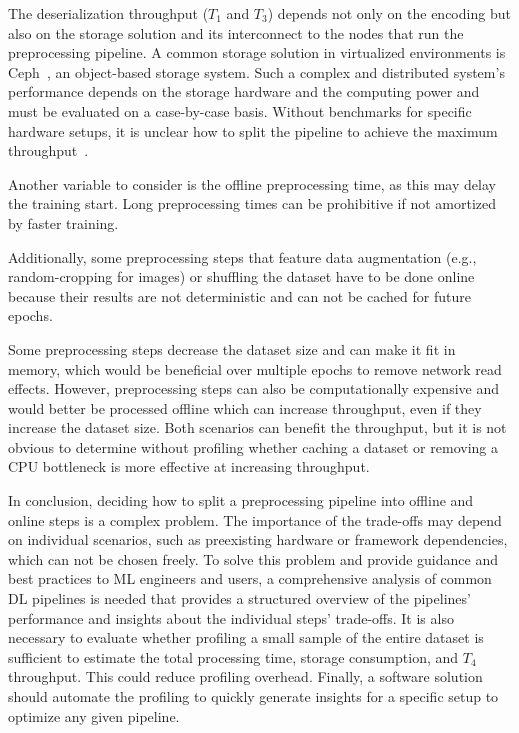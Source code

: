 The deserialization throughput ($T_1$ and $T_3$) depends not only on the encoding but also on the storage solution and its interconnect to the nodes that run the preprocessing pipeline.
A common storage solution in virtualized environments is Ceph~\cite{weil2006ceph}, an object-based storage system.
Such a complex and distributed system's performance depends on the storage hardware and the computing power and must be evaluated on a case-by-case basis.
Without benchmarks for specific hardware setups, it is unclear how to split the pipeline to achieve the maximum throughput~\cite{ra2018understanding,mohan2020analyzing}.

Another variable to consider is the offline preprocessing time, as this may delay the training start.
Long preprocessing times can be prohibitive if not amortized by faster training.

Additionally, some preprocessing steps that feature data augmentation (e.g., random-cropping for images) or shuffling the dataset have to be done online because their results are not deterministic and can not be cached for future epochs.

{\color{diff3}
Some preprocessing steps decrease the dataset size and can make it fit in memory, which would be beneficial over multiple epochs to remove network read effects.
However, preprocessing steps can also be computationally expensive and would better be processed offline which can increase throughput, even if they increase the dataset size.
Both scenarios can benefit the throughput, but it is not obvious to determine without profiling whether caching a dataset or removing a CPU bottleneck is more effective at increasing throughput.
}

In conclusion, deciding how to split a preprocessing pipeline into offline and online steps is a complex problem.
The importance of the trade-offs may depend on individual scenarios, such as preexisting hardware or framework dependencies, which can not be chosen freely.
To solve this problem and provide guidance and best practices to ML engineers and users, a comprehensive analysis of common DL pipelines is needed that provides a structured overview of the pipelines' performance and insights about the individual steps' trade-offs.
It is also necessary to evaluate whether profiling a small sample of the entire dataset is sufficient to estimate the total processing time, storage consumption, and $T_4$ throughput.
This could reduce profiling overhead.
Finally, a software solution should automate the profiling to quickly generate insights for a specific setup to optimize any given pipeline.


